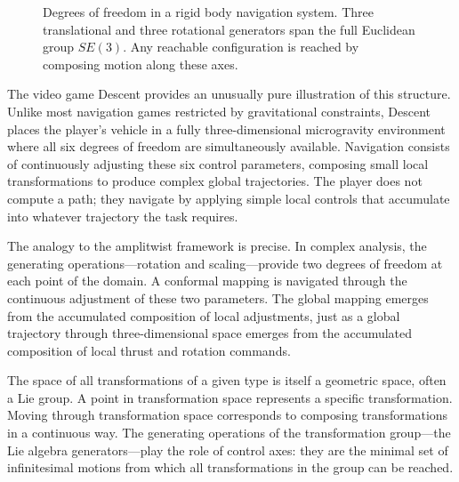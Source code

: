 \documentclass[11pt, a4paper]{article}
\theoremstyle{plain}
\theoremstyle{definition}
\theoremstyle{remark}
\begin{document}
\begin{figure}[h]
\centering
{}
\caption{Degrees of freedom in a rigid body navigation system. Three translational and
three rotational generators span the full Euclidean group $SE(3)$. Any reachable
configuration is reached by composing motion along these axes.}
\end{figure}

The video game Descent provides an unusually pure illustration of this structure. Unlike
most navigation games restricted by gravitational constraints, Descent places the
player's vehicle in a fully three-dimensional microgravity environment where all six
degrees of freedom are simultaneously available. Navigation consists of continuously
adjusting these six control parameters, composing small local transformations to produce
complex global trajectories. The player does not compute a path; they navigate by
applying simple local controls that accumulate into whatever trajectory the task requires.

The analogy to the amplitwist framework is precise. In complex analysis, the generating
operations---rotation and scaling---provide two degrees of freedom at each point of the
domain. A conformal mapping is navigated through the continuous adjustment of these two
parameters. The global mapping emerges from the accumulated composition of local
adjustments, just as a global trajectory through three-dimensional space emerges from
the accumulated composition of local thrust and rotation commands.

The space of all transformations of a given type is itself a geometric space, often a
Lie group. A point in transformation space represents a specific transformation. Moving
through transformation space corresponds to composing transformations in a continuous
way. The generating operations of the transformation group---the Lie algebra
generators---play the role of control axes: they are the minimal set of infinitesimal
motions from which all transformations in the group can be reached.
\end{document}
